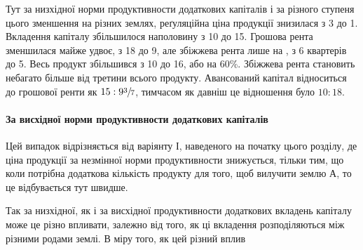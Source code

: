 \noindent{}Тут за низхідної норми продуктивности додаткових капіталів і за різного
ступеня цього зменшення на різних землях, реґуляційна ціна продукції знизилася
з 3 до 1. Вкладення капіталу збільшилося наполовину з 10 до 15. Грошова рента зменшилася майже удвоє, з 18 до 9, але збіжжева рента лише на ,
з 6 квартерів до 5. Весь продукт
збільшився з 10 до 16, або на 60\%.
Збіжжева рента становить небагато більше
від третини всього продукту. Авансований капітал відноситься до грошової ренти
як $15 : 9\sfrac{3}{7}$, тимчасом як давніш це відношення було $10:18$.

\paragraph{За висхідної норми продуктивности додаткових капіталів}

Цей випадок відрізняється від варіянту І, наведеного на початку цього
розділу, де ціна продукції за незмінної норми продуктивности знижується, тільки
тим, що коли потрібна додаткова кількість продукту для того, щоб вилучити
землю $А$, то це відбувається тут швидше.

Так за низхідної, як і за висхідної продуктивности додаткових вкладень
капіталу може це різно впливати, залежно від того, як ці вкладення розподіляються
між різними родами землі. В міру того, як цей різний вплив
\parbreak{}  %
